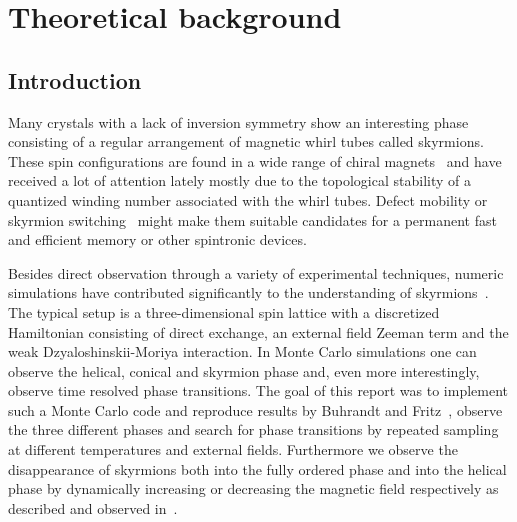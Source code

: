 %
\chapter{Theoretical background}\label{chap:1}
%

%
\section{Introduction}\label{sec:intro}
%
Many crystals with a lack of inversion symmetry show an interesting phase
consisting of a regular arrangement of magnetic whirl tubes called skyrmions.
These spin configurations are found in a wide range of chiral
magnets~\cite{skyrm1, skyrm2, skyrm3, skyrm4, skyrm5, skyrm6, Milde, skyrm8,
skyrm9, skyrm10} and have received a lot of attention lately mostly due to the
topological stability of a quantized winding number associated with the whirl
tubes. Defect mobility or skyrmion switching~\cite{switch} might make them
suitable candidates for a permanent fast and efficient memory or other
spintronic devices.

Besides direct observation through a variety of experimental techniques, numeric
simulations have contributed significantly to the understanding of
skyrmions~\cite{skyrmion, Milde, switch}. The typical setup is a
three-dimensional spin lattice with a discretized Hamiltonian consisting of
direct exchange, an external field Zeeman term and the weak
Dzyaloshinskii-Moriya interaction. In Monte Carlo simulations one can observe
the helical, conical and skyrmion phase and, even more interestingly, observe
time resolved phase transitions. The goal of this report was to implement such a
Monte Carlo code and reproduce results by Buhrandt and Fritz~\cite{skyrmion},
\ie{} observe the three different phases and search for phase transitions by
repeated sampling at different temperatures and external fields. Furthermore we
observe the disappearance of skyrmions both into the fully ordered phase and
into the helical phase by dynamically increasing or decreasing the magnetic
field respectively as described and observed in~\cite{Milde,progress}.


